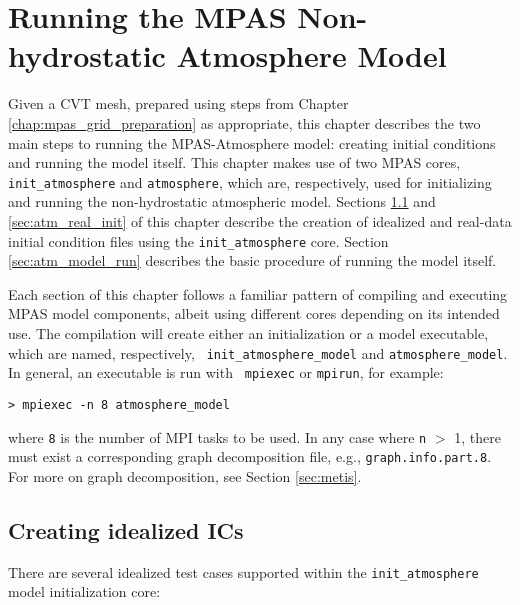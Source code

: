 
\chapter{Running the MPAS Non-hydrostatic Atmosphere Model}
\label{chap:running_mpas_a}

\setlength\LTleft{0.0in}

Given a CVT mesh, prepared using steps from Chapter \ref{chap:mpas_grid_preparation} as appropriate,
this chapter describes the two main steps to running the MPAS-Atmosphere model: creating initial
conditions and running the model itself.  This chapter makes use of two MPAS cores, {\tt
init\_atmosphere} and {\tt atmosphere}, which are, respectively, used for initializing and running
the non-hydrostatic atmospheric model.  Sections \ref{sec:atm_ideal_init} and
\ref{sec:atm_real_init} of this chapter describe the creation of idealized and real-data initial
condition files using the {\tt init\_atmosphere} core. Section \ref{sec:atm_model_run} describes the
basic procedure of running the model itself.

Each section of this chapter follows a familiar pattern of compiling and executing MPAS model
components, albeit using different cores depending on its intended use.  The compilation will create
either an initialization or a model executable, which are named, respectively, {\tt
init\_atmosphere\_model} and {\tt atmosphere\_model}.  In general, an executable is run with {\tt
mpiexec} or {\tt mpirun}, for example:

\vspace{12pt}
{\tt > mpiexec -n 8 atmosphere\_model}
\vspace{12pt}


\noindent where {\tt 8} is the number of MPI tasks to be used.  In any case where {\tt n} $>$ 1, there must exist a corresponding graph decomposition file, e.g., {\tt graph.info.part.8}. For more on graph decomposition, see Section \ref{sec:metis}.  

\section{Creating idealized ICs}
\label{sec:atm_ideal_init}

There are several idealized test cases supported within the {\tt init\_atmosphere} model initialization core:

